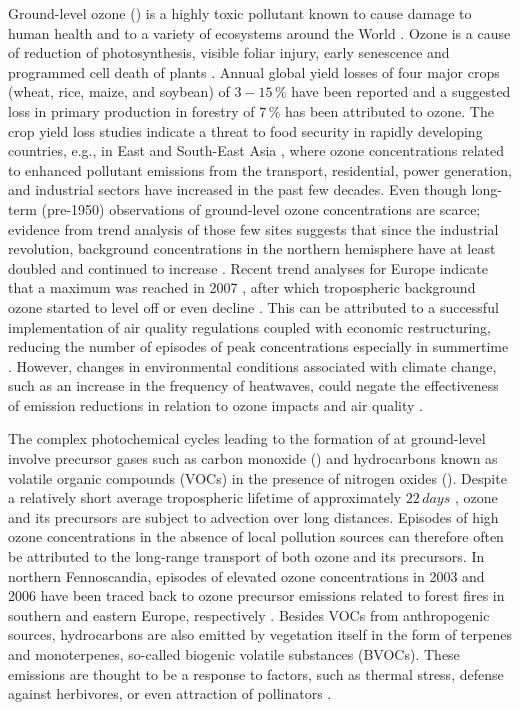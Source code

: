 \documentclass[bg, manuscript]{copernicus}
\begin{document}
Ground-level ozone () is a highly toxic pollutant known to cause damage to human health \citep{WHO2008} and to a variety of ecosystems around the World \citep{PT:Emberson2020}. Ozone is a cause of reduction of photosynthesis, visible foliar injury, early senescence and programmed cell death of plants \citep{PCE:Kangasjarvi2005}. Annual global yield losses of four major crops (wheat, rice, maize, and soybean) of $3-15\,\unit{\%}$ have been reported \citep{PJ:Ainsworth2017} and a suggested loss in primary production in forestry of $7\,\unit{\%}$ \citep{GCB:Wittig2009,EP:Matyssek2012} has been attributed to ozone.
The crop yield loss studies indicate a threat to food security in rapidly developing countries, e.g., in East and South-East Asia \citep{GCB:Tang2013,NCC:Tai2014,AE:Chuwah2015,GCB:Mills2018}, where ozone concentrations related to enhanced pollutant emissions from the transport, residential, power generation, and industrial sectors have increased in the past few decades. Even though long-term (pre-1950) observations of ground-level ozone concentrations are scarce; evidence from trend analysis of those few sites suggests that since the industrial revolution, background concentrations in the northern hemisphere have at least doubled and continued to increase \citep{IPCC2013}. Recent trend analyses for Europe indicate that a maximum was reached in 2007 \citep{AE:Derwent2018}, after which tropospheric background ozone started to level off or even decline \citep{ESA:Cooper2014, ACP:Wespes2018,ESA:Gaudel2018}. This can be attributed to a successful implementation of air quality regulations coupled with economic restructuring, reducing the number of episodes of peak concentrations especially in summertime \citep[e.g.,][]{ESA:Fleming2018, ESA:Mills2018}. However, changes in environmental conditions associated with climate change, such as an increase in the frequency of heatwaves, could negate the effectiveness of emission reductions in relation to ozone impacts and air quality \citep{NCC:Lin2020}.

The complex photochemical cycles leading to the formation of  at ground-level involve precursor gases such as carbon monoxide () and hydrocarbons known as volatile organic compounds (VOCs) in the presence of nitrogen oxides (). Despite a relatively short average tropospheric lifetime of approximately $22\,\unit{days}$ \citep{JGR:Stevenson2005,ACP:Young2013}, ozone and its precursors are subject to advection over long distances. Episodes of high ozone concentrations in the absence of local pollution sources can therefore often be attributed to the long-range transport of both ozone and its precursors. In northern Fennoscandia, episodes of elevated ozone concentrations in 2003 and 2006 have been traced back to ozone precursor emissions related to forest fires in southern and eastern Europe, respectively \citep{AE:Lindskog2007,EP:Karlsson2013}. Besides VOCs from anthropogenic sources, hydrocarbons are also emitted by vegetation itself in the form of terpenes and monoterpenes, so-called biogenic volatile substances (BVOCs). These emissions are thought to be a response to factors, such as thermal stress, defense against herbivores, or even attraction of pollinators \citep{TPS:Penuelas2003}. 
\end{document}

